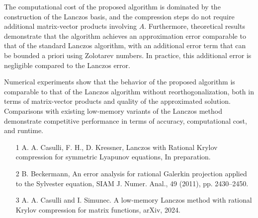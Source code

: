 \documentclass[ILAS2025-program.tex]{subfiles}
\begin{document}
\begin{ilasabstract}
The computational cost of the proposed algorithm is dominated by the construction of the Lanczos basis, and the compression steps do not require additional matrix-vector products involving $A$. Furthermore, theoretical results demonstrate that the algorithm achieves an approximation error comparable to that of the standard Lanczos algorithm, with an additional error term that can be bounded a priori using Zolotarev numbers. In practice, this additional error is negligible compared to the Lanczos error.

Numerical experiments show that the behavior of the proposed algorithm is comparable to that of the Lanczos algorithm without reorthogonalization, both in terms of matrix-vector products and quality of the approximated solution. Comparisons with existing low-memory variants of the Lanczos method demonstrate competitive performance in terms of accuracy, computational cost, and runtime.


\begin{itemize}
\item[1] A. A. Casulli, F. H., D. Kressner, Lanczos with Rational Krylov compression for symmetric Lyapunov equations, In preparation.
\item[2] B. Beckermann, An error analysis for rational Galerkin projection applied to the Sylvester
equation, SIAM J. Numer. Anal., 49 (2011), pp. 2430--2450. 
\item[3] A. A. Casulli and I. Simunec. A low-memory Lanczos method with rational
Krylov compression for matrix functions, arXiv, 2024.
\end{itemize} 
\end{ilasabstract}
\end{document}
